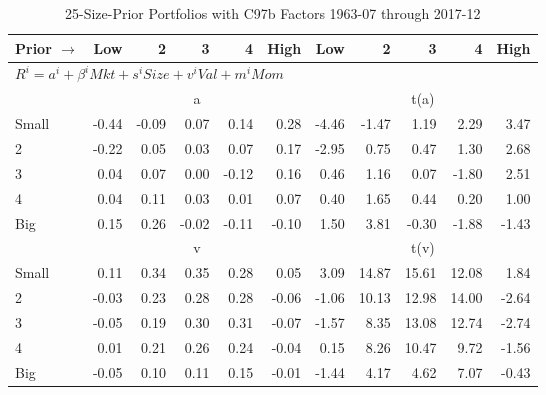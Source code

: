 
\begin{table}[!ht]
\footnotesize
\centering
\caption{25-Size-Prior Portfolios with C97b Factors 1963-07 through 2017-12}
\begin{tabular}{lrrrrrrrrrr}
  \toprule
    Prior $\rightarrow$ & Low & 2 & 3 & 4 & High & Low & 2 & 3 & 4 & High \\ 
  \midrule
  \multicolumn{11}{l}{$R^i=a^i+\beta^iMkt+s^iSize+v^iVal+m^iMom$} \\

  
    
      & \multicolumn{5}{c}{a} & \multicolumn{5}{c}{t(a)}
    
    \\
      \cmidrule(r){2-6} \cmidrule(r){7-11}

    Small   & -0.44  & -0.09  & 0.07  & 0.14  & 0.28  & -4.46  & -1.47  & 1.19  & 2.29  & 3.47  \\
         2  & -0.22  & 0.05  & 0.03  & 0.07  & 0.17  & -2.95  & 0.75  & 0.47  & 1.30  & 2.68  \\
         3  & 0.04  & 0.07  & 0.00  & -0.12  & 0.16  & 0.46  & 1.16  & 0.07  & -1.80  & 2.51  \\
         4  & 0.04  & 0.11  & 0.03  & 0.01  & 0.07  & 0.40  & 1.65  & 0.44  & 0.20  & 1.00  \\
    Big     & 0.15  & 0.26  & -0.02  & -0.11  & -0.10  & 1.50  & 3.81  & -0.30  & -1.88  & -1.43  \\

  
    
      & \multicolumn{5}{c}{v} & \multicolumn{5}{c}{t(v)}
    
    \\
      \cmidrule(r){2-6} \cmidrule(r){7-11}

    Small   & 0.11  & 0.34  & 0.35  & 0.28  & 0.05  & 3.09  & 14.87  & 15.61  & 12.08  & 1.84  \\
         2  & -0.03  & 0.23  & 0.28  & 0.28  & -0.06  & -1.06  & 10.13  & 12.98  & 14.00  & -2.64  \\
         3  & -0.05  & 0.19  & 0.30  & 0.31  & -0.07  & -1.57  & 8.35  & 13.08  & 12.74  & -2.74  \\
         4  & 0.01  & 0.21  & 0.26  & 0.24  & -0.04  & 0.15  & 8.26  & 10.47  & 9.72  & -1.56  \\
    Big     & -0.05  & 0.10  & 0.11  & 0.15  & -0.01  & -1.44  & 4.17  & 4.62  & 7.07  & -0.43  \\

  
    

\end{tabular}
\end{table}
